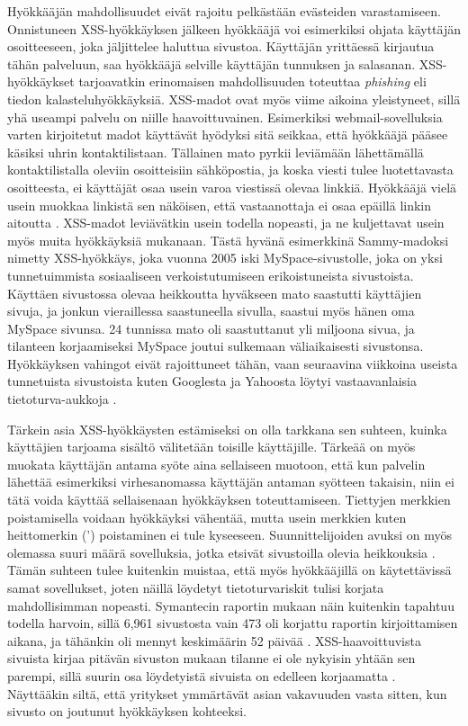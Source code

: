 Hyökkääjän mahdollisuudet eivät rajoitu pelkästään evästeiden varastamiseen. Onnistuneen XSS-hyökkäyksen jälkeen hyökkääjä voi esimerkiksi ohjata
käyttäjän osoitteeseen, joka jäljittelee haluttua sivustoa. Käyttäjän yrittäessä kirjautua tähän palveluun, saa hyökkääjä selville käyttäjän tunnuksen ja
salasanan. XSS-hyökkäykset tarjoavatkin erinomaisen mahdollisuuden toteuttaa \textit{phishing} eli tiedon kalasteluhyökkäyksiä. XSS-\-madot ovat
myös viime aikoina yleistyneet, sillä yhä useampi palvelu on niille haavoittuvainen. Esimerkiksi webmail-sovelluksia varten kirjoitetut madot 
käyttävät hyödyksi sitä seikkaa, että hyökkääjä pääsee käsiksi uhrin kontaktilistaan. Tällainen mato pyrkii leviämään lähettämällä 
kontaktilistalla oleviin osoitteisiin sähköpostia, ja koska viesti tulee luotettavasta osoitteesta, ei käyttäjät osaa usein varoa viestissä
olevaa linkkiä. Hyökkääjä vielä usein muokkaa linkistä sen näköisen, että vastaanottaja ei osaa epäillä linkin aitoutta \cite{WEB2}. 
XSS-madot leviävätkin usein todella nopeasti, ja ne kuljettavat usein myös muita hyökkäyksiä mukanaan. Tästä hyvänä esimerkkinä
Sammy-madoksi nimetty XSS-hyökkäys, joka vuonna 2005 iski MySpace-sivustolle, joka on yksi tunnetuimmista sosiaaliseen verkoistutumiseen
erikoistuneista sivustoista. Käyttäen sivustossa olevaa heikkoutta hyväkseen mato saastutti käyttäjien sivuja, ja jonkun vieraillessa 
saastuneella sivulla, saastui myös hänen oma MySpace sivunsa. 24 tunnissa mato oli saastuttanut yli miljoona sivua, ja tilanteen korjaamiseksi
MySpace joutui sulkemaan väliaikaisesti sivustonsa. Hyökkäyksen vahingot eivät rajoittuneet tähän, vaan seuraavina viikkoina useista tunnetuista sivustoista
kuten Googlesta ja Yahoosta löytyi vastaavanlaisia tietoturva-aukkoja \cite{WEB2b}.

Tärkein asia XSS-hyökkäysten estämiseksi on olla tarkkana sen suhteen, kuinka käyttäjien tarjoama sisältö välitetään toisille käyttäjille.
Tärkeää on myös muokata käyttäjän antama syöte aina sellaiseen muotoon, että kun palvelin lähettää esimerkiksi virhesanomassa käyttäjän antaman syötteen
takaisin, niin ei tätä voida käyttää sellaisenaan hyökkäyksen toteuttamiseen. Tiettyjen merkkien poistamisella voidaan hyökkäyksi vähentää,
mutta usein merkkien kuten heittomerkin (') poistaminen ei tule kyseeseen. Suunnittelijoiden avuksi on myös olemassa suuri määrä sovelluksia, jotka
etsivät sivustoilla olevia heikkouksia \cite{WEB2}. Tämän suhteen tulee kuitenkin muistaa, että myös hyökkääjillä on käytettävissä samat sovellukset, joten 
näillä löydetyt tietoturvariskit tulisi korjata mahdollisimman nopeasti. Symantecin raportin mukaan näin kuitenkin tapahtuu todella harvoin, sillä 6,961 
sivustosta vain 473 oli korjattu raportin kirjoittamisen aikana, ja tähänkin oli mennyt keskimäärin 52 päivää \cite{SYM}. XSS-haavoittuvista sivuista
kirjaa pitävän sivuston mukaan tilanne ei ole nykyisin yhtään sen parempi, sillä suurin osa löydetyistä sivuista on edelleen korjaamatta \cite{XSS}.
Näyttääkin siltä, että yritykset ymmärtävät asian vakavuuden vasta sitten, kun sivusto on joutunut hyökkäyksen kohteeksi.

